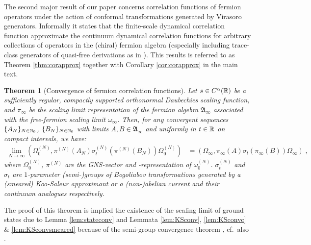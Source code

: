 \documentclass[a4paper, 11pt]{article}
\newcommand{\fA}{\mathfrak{A}}\newcommand{\cA}{\mathcal{A}}\newcommand{\dA}{\mathds{A}}\newcommand{\sA}{\mathscr{A}}
\DeclareMathOperator{\1}{\mathds{1}}
\newtheorem{letterthm}{Theorem}
\begin{document}
The second major result of our paper concerns correlation functions of fermion operators under the action of conformal transformations generated by Virasoro generators. Informally it states that the finite-scale dynamical correlation function approximate the continuum dynamical correlation functions for arbitrary collections of operators in the (chiral) fermion algebra (especially including trace-class generators of quasi-free derivations as in \cite{WitteveenQuantumCircuitApproximations}). This results is referred to as Theorem \ref{thm:corapprox} together with Corollary \ref{cor:corapprox} in the main text.
\begin{letterthm}[Convergence of fermion correlation functions]
\label{thm:B}
Let $s\in C^{\alpha}(\mathbb{R})$ be a sufficiently regular, compactly supported orthonormal Daubechies scaling function, and $\pi_{\infty}$ be the scaling limit representation of the fermion algebra $\fA_{\infty}$ associated with the free-fermion scaling limit $\omega_{\infty}$. Then, for any convergent sequences $\{A_{N}\}_{N\in\mathbb{N}_{0}}$, $\{B_{N}\}_{N\in\mathbb{N}_{0}}$ with limits $A, B\in\fA_{\infty}$ and uniformly in $t\in\mathbb{R}$ on compact intervals, we have:
\begin{align*}
\lim_{N\rightarrow\infty}(\Omega^{(N)}_{0},\pi^{(N)}(A_{N})\sigma^{(N)}_{t}(\pi^{(N)}(B_{N}))\Omega^{(N)}_{0}) & = (\Omega_{\infty},\pi_{\infty}(A)\sigma_{t}(\pi_{\infty}(B))\Omega_{\infty})\;,
\end{align*}
where $\Omega^{(N)}_{0}$, $\pi^{(N)}$ are the GNS-vector and -representation of $\omega^{(N)}_{0}$. $\sigma^{(N)}_{t}$ and $\sigma_{t}$ are $1$-parameter (semi-)groups of Bogoliubov transformations generated by a (smeared) Koo-Saleur approximant or a (non-)abelian current and their continuum analogues respectively.
\end{letterthm}
The proof of this theorem is implied the existence of the scaling limit of ground states due to Lemma \ref{lem:stateconv} and Lemmata \ref{lem:KSconv}, \ref{lem:KSconvc} \& \ref{lem:KSconvsmeared} because of the semi-group convergence theorem \cite[Theorem 2.16, p. 504]{KatoPerturbationTheoryFor}, cf.~also \cite[Theorem 1.8, p. 141]{EngelAShortCourse}.

\bigskip
\end{document}
